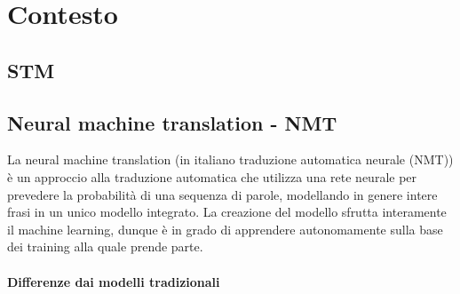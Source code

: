 \clearpage{\pagestyle{empty}\cleardoublepage}
\chapter{Contesto}                %
\lhead[\fancyplain{}{\bfseries\thepage}]{\fancyplain{}{\bfseries\rightmark}}


\section{STM}

\section{Neural machine translation - NMT}                 %
La neural machine translation (in italiano traduzione automatica neurale (NMT))  è un approccio alla traduzione automatica che utilizza una rete neurale per prevedere la probabilità di una sequenza di parole, modellando in genere intere frasi in un unico modello integrato. La creazione del modello sfrutta interamente il machine learning, dunque è in grado di apprendere autonomamente sulla base dei training alla quale prende parte. 

\subsubsection{Differenze dai modelli tradizionali}

